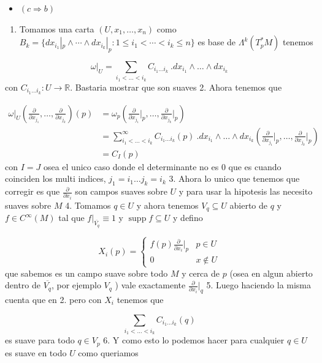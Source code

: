 \begin{bookproof}{}
\begin{itemize}
\item $(c\Rightarrow b)$
\end{itemize}
\begin{enumerate}
\item Tomamos una carta $(U,x_{1},\ldots,x_{n})$ como $B_k=\{dx_{i_1}|_p\wedge\cdots\wedge dx_{i_k}|_p:1\le i_1<\cdots<i_k\le n\}$ es base de $\Lambda^{k}(T_{p}^{*}M)$ tenemos
\end{enumerate}
\[
\omega|_{U}=\sum_{i_{1}<\ldots<i_{k}} C_{i_{1}\ldots i_{k}}\ .dx_{i_{1}}\wedge\ldots\wedge dx_{i_{k}}
\]
con $C_{i_{1}\ldots i_{k}}:U \rightarrow\mathbb{R}$. Bastaria mostrar que son suaves 2. Ahora tenemos que

\[
\begin{aligned}\omega|_{U}\left(\frac{\partial}{\partial x_{j_{1}}},\ldots, \frac{\partial}{\partial x_{j_{k}}}\right)(p)& =\omega_{p}\left(\frac{\partial}{\partial x_{j_{1}}}\bigg|_{p},\ldots, \frac{\partial}{\partial x_{j_{k}}}\bigg|_{p}\right)\\&=\sum^{\infty}_{i_{1}<\ldots<i_{k}}C_{i_{1}\ldots i_{k}}(p) \ .dx_{i_{1}}\wedge\ldots\wedge dx_{i_{k}}\left(\frac{\partial}{\partial x_{j_{1}}}\bigg|_{p},\ldots, \frac{\partial}{\partial x_{j_{k}}}\bigg|_{p}\right)\\&=C_{I}(p)\end{aligned}
\]
con $I=J$ osea el unico caso donde el determinante no es $0$ que es cuando coinciden los multi indices, $j_{1}=i_{1}\ldots j_{k}=i_{k}$ 3. Ahora lo unico que tenemos que corregir es que $\frac{\partial}{\partial x_{i}}$ son campos suaves sobre $U$  y para usar la hipotesis las necesito suaves sobre $M$ 4. Tomamos $q\in U$ y ahora tenemos $V_{q}\subseteq U$ abierto de $q$ y $f\in C^{\infty}(M)$ tal que $f|_{\overline{V_{q}}}\equiv 1$ y $\operatorname{supp}f\subseteq U$ y defino

\[
X_{i}(p)=\begin{cases} f(p)\frac{\partial}{\partial x_{i}}\bigg|_{p} & p\in U \\0 & x\not\in U \end{cases}
\]
que sabemos es un campo suave sobre todo $M$ y cerca de $p$ (osea en algun abierto dentro de $\overline{V_{q}}$, por ejemplo $V_{q}$ ) vale exactamente $\frac{\partial}{\partial x_{i}}\bigg|_{q}$ 5. Luego haciendo la misma cuenta que en 2. pero con $X_{i}$ tenemos que

\[
\sum_{i_{1}<\ldots<i_{k}} C_{i_{1}\ldots i_{k}}(q)
\]
es suave para todo $q\in V_{p}$ 6. Y como esto lo podemos hacer para cualquier $q\in U$ es suave en todo $U$ como queriamos

\bookqed
\end{bookproof}
